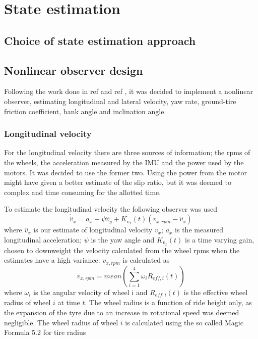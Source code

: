 \section{State estimation}
\subsection{Choice of state estimation approach}
\subsection{Nonlinear observer design}


Following the work done in ref \cite{Automatica08} and ref \cite{MainStateEst}, it was decided to implement a nonlinear observer, estimating longitudinal and lateral velocity, yaw rate, ground-tire friction coefficient, bank angle and inclination angle. 

\subsubsection{Longitudinal velocity}
For the longitudinal velocity there are three sources of information; the rpms of the wheels, the acceleration measured by the IMU and the power used by the motors. It was decided to use the former two. Using the power from the motor might have given a better estimate of the slip ratio, but it was deemed to complex and time consuming for the allotted time. 

To estimate the longitudinal velocity the following observer was used
\begin{equation}
    \dot{\hat{v}}_x = a_x + \dot{\psi}\hat{v}_y + K_{v_x}(t)(v_{x,rpm} - \hat{v}_x)
\end{equation}
where $\hat{v}_x$ is our estimate of longitudinal velocity $v_x$; $a_x$ is the measured longitudinal acceleration; $\psi$ is the yaw angle and $K_{v_x}(t)$ is a time varying gain, chosen to downweight the velocity calculated from the wheel rpms when the estimates have a high variance. $v_{x,rpm}$ is calculated as 
\begin{equation}
    v_{x,rpm} = mean(\sum_{i=1}^{4} \omega_{i}R_{eff,i}(t))
\end{equation}
where $\omega_i$ is the angular velocity of wheel i and $R_{eff,i}(t)$ is the effective wheel radius of wheel $i$ at time $t$. The wheel radius is a function of ride height only, as the expansion of the tyre due to an increase in rotational speed was deemed negligible. The wheel radius of wheel $i$ is calculated using the so called Magic Formula 5.2 for tire radius \cite{MagicFormula5_2}

